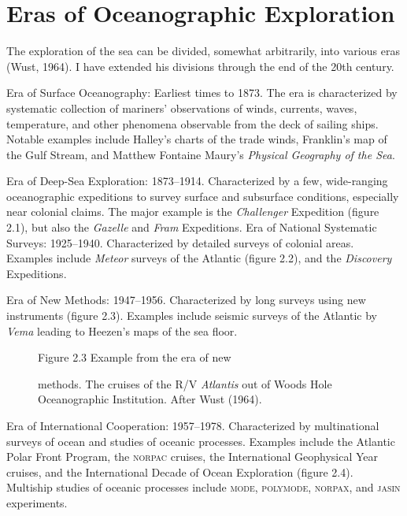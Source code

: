 \section{Eras of Oceanographic Exploration}
The exploration of the sea
can be divided, somewhat arbitrarily, into various eras (Wust,
1964). I have extended his divisions through the end of the 20th
century.
\begin{enumerate}
\vitem Era of Surface Oceanography: Earliest times to 1873. The era is
characterized by systematic collection of mariners' observations of
winds, currents, waves, temperature, and other phenomena observable
from the deck of sailing ships. Notable examples include Halley's
charts of the trade winds, Franklin's map of the Gulf
Stream, and Matthew
Fontaine Maury's \textit{Physical Geography of the Sea}.

\vitem Era of Deep-Sea Exploration: 1873--1914.  Characterized by a
few, wide-ranging oceanographic expeditions to survey surface and
subsurface conditions, especially near colonial claims. The major
example is the \textit{Challenger} Expedition (figure 2.1), but also
the \textit{Gazelle} and \textit{Fram} Expeditions.  \vitem Era of
National Systematic Surveys: 1925--1940.  Characterized by detailed
surveys of colonial areas. Examples include \textit{Meteor} surveys of
the Atlantic (figure 2.2), and the \textit{Discovery} Expeditions.

\vitem Era of New Methods: 1947--1956.  Characterized by long surveys
using new instruments (figure 2.3). Examples include seismic surveys
of the Atlantic by \textit{Vema} leading to Heezen's maps of the sea
floor.

\begin{figure}[t!]
\centering
\footnotesize
Figure 2.3 Example from the era of new \rule{0pt}{4ex}methods. The
cruises of the R/V \textit{Atlantis} out of Woods Hole Oceanographic
Institution. After Wust (1964).

\label{fig:Fig2-3}
\vspace{-3ex}
\end{figure}

\vitem Era of International Cooperation: 1957--1978. Characterized by
multinational surveys of ocean and studies of oceanic
processes. Examples include the Atlantic Polar Front Program, the
\textsc{norpac} cruises, the International Geophysical Year cruises,
and the International Decade of Ocean Exploration (figure 2.4).
Multiship studies of oceanic processes include \textsc{mode},
\textsc{polymode}, \textsc{norpax}, and \textsc{jasin} experiments.


\end{enumerate}
